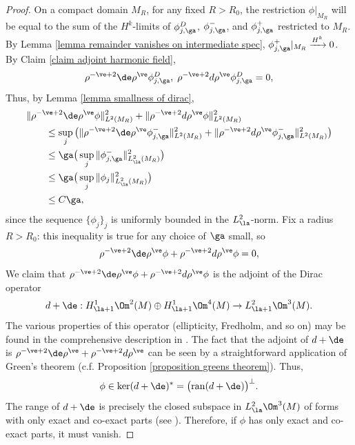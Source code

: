\documentclass[hidelinks, 12pt, oneside, reqno]{amsart}
\begin{document}
\begin{proof}
    On a compact domain $M_{R}$, for any fixed $R > R_0$, the restriction $\phi |_{M_R}$ will be equal to the sum of the $H^k$-limits of $\phi_{j,\ga}^D$, $\phi_{j,\ga}^-$, and $\phi_{j, \ga}^+$ restricted to $M_R$. By Lemma \ref{lemma remainder vanishes on intermediate spec}, $\phi_{j, \ga}^+|_{M_R} \xrightarrow{H^k} 0$. By Claim \ref{claim adjoint harmonic field}, 
    \[
    \rho^{-\ve + 2} \de \rho^\ve \phi_{j,\ga}^D,\; \rho^{-\ve + 2} d \rho^\ve \phi_{j,\ga}^D = 0,
    \]
    Thus, by Lemma \ref{lemma smallness of dirac}, 
    \begin{align*}
        &\|\rho^{-\ve + 2} \de \rho^\ve \phi\|_{L^2(M_R)}^2 + \|\rho^{-\ve + 2} d \rho^\ve \phi\|_{L^2(M_R)}^2 \\ &\qquad \le \sup_j \big(\|\rho^{-\ve + 2} \de \rho^\ve \phi_{j,\ga}^-\|_{L^2(M_R)}^2 + \|\rho^{-\ve + 2} d \rho^\ve \phi_{j,\ga}^-\|_{L^2(M_R)}^2\big) \\
        &\qquad \le \ga \big(\sup_j \|\phi_{j,\ga}^-\|_{L^2_\la(M_R)}^2 \big)\\
        &\qquad \le \ga \big(\sup_j \|\phi_j \|_{L^2_\la(M_R)}^2 \big)\\
        &\qquad \le C \ga,
    \end{align*}
    since the sequence $\{ \phi_j\}_j$ is uniformly bounded in the $L^2_\la$-norm. Fix a radius $R>R_0$: this inequality is true for any choice of $\ga$ small, so
    \[
    \rho^{-\ve + 2} \de \rho^\ve \phi + \rho^{-\ve + 2} d \rho^\ve \phi = 0,
    \]
    We claim that $\rho^{-\ve + 2} \de \rho^\ve \phi + \rho^{-\ve + 2} d \rho^\ve \phi$ is the adjoint of the Dirac operator 
    \[
    d + \de : H^1_{\la + 1}\Om^2(M) \oplus H^1_{\la + 1}\Om^4(M) \rightarrow L^2_{\la + 1}\Om^3(M).
    \]
    The various properties of this operator (ellipticity, Fredholm, and so on) may be found in the comprehensive description in \cite[\S 4.2]{KarigiannisLotay}. The fact that the adjoint of $d + \de$ is $\rho^{-\ve + 2} \de \rho^\ve + \rho^{-\ve + 2} d \rho^\ve$ can be seen by a straightforward application of Green's theorem (c.f. Proposition \ref{proposition greens theorem}). Thus,
    \[
    \phi \in \ker (d + \de)^* = \big(\mathrm{ran}(d + \de)\big)^\perp.
    \]
    The range of $d + \de$ is precisely the closed subspace in $L^2_{\la}\Om^3(M)$ of forms with only exact and co-exact parts (see \cite[Lemma 4.30]{KarigiannisLotay}). Therefore, if $\phi$ has only exact and co-exact parts, it must vanish.
\end{proof}




\end{document}
